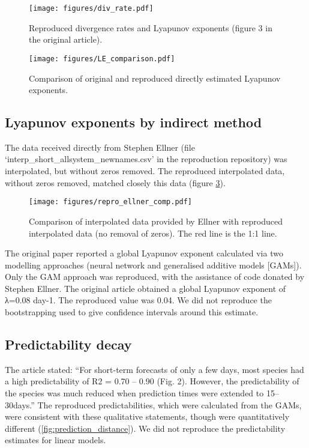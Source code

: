 \documentclass[10pt,a4paper,onecolumn]{article}
\renewcommand{\includegraphics}[2][]{\OldIncludegraphics[width=12cm, #1]{#2}}
\begin{document}
\begin{figure}[htbp]
\centering
\texttt{[image: figures/div\_rate.pdf]}
\caption{\label{fig:divergence}Reproduced divergence rates and Lyapunov
exponents (figure 3 in the original article).}
\end{figure}

\begin{figure}[htbp]
\centering
\texttt{[image: figures/LE\_comparison.pdf]}
\caption{\label{fig:LE_comparison}Comparison of original and reproduced
directly estimated Lyapunov exponents.}
\end{figure}

\subsection{Lyapunov exponents by indirect
method}\label{lyapunov-exponents-by-indirect-method}

The data received directly from Stephen Ellner (file
`interp\_short\_allsystem\_newnames.csv' in the reproduction repository)
was interpolated, but without zeros removed. The reproduced interpolated
data, without zeros removed, matched closely this data (figure
\ref{fig:trans_comp2}).

\begin{figure}[htbp]
\centering
\texttt{[image: figures/repro\_ellner\_comp.pdf]}
\caption{\label{fig:trans_comp2}Comparison of interpolated data provided
by Ellner with reproduced interpolated data (no removal of zeros). The
red line is the 1:1 line.}
\end{figure}

The original paper reported a global Lyapunov exponent calculated via
two modelling approaches (neural network and generalised additive models
{[}GAMs{]}). Only the GAM approach was reproduced, with the assistance
of code donated by Stephen Ellner. The original article obtained a
global Lyapunov exponent of λ=0.08 day-1. The reproduced value was 0.04.
We did not reproduce the bootstrapping used to give confidence intervals
around this estimate.

\subsection{Predictability decay}\label{predictability-decay}

The article stated: ``For short-term forecasts of only a few days, most
species had a high predictability of R2 = 0.70 -- 0.90 (Fig. 2).
However, the predictability of the species was much reduced when
prediction times were extended to 15--30days.'' The reproduced
predictabilities, which were calculated from the GAMs, were consistent
with these qualitative statements, though were quantitatively different
(\ref{fig:prediction_distance}). We did not reproduce the predictability
estimates for linear models.
\end{document}
